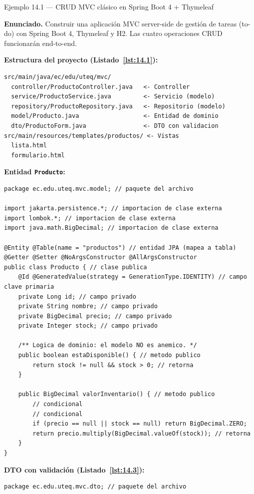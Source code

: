 \begin{cajaejemplo}{Ejemplo 14.1 --- CRUD MVC clásico en Spring Boot 4 + Thymeleaf}


\textbf{Enunciado.} Construir una aplicación MVC server-side de gestión de tareas (to-do) con Spring Boot 4, Thymeleaf y H2. Las cuatro operaciones CRUD funcionarán end-to-end.

\textbf{Estructura del proyecto (Listado~\ref{lst:14.1}):}
\begin{lstlisting}[style=shell,numbers=none,caption={Ejemplo de Shell},label=lst:14.1]
src/main/java/ec/edu/uteq/mvc/
  controller/ProductoController.java   <- Controller
  service/ProductoService.java         <- Servicio (modelo)
  repository/ProductoRepository.java   <- Repositorio (modelo)
  model/Producto.java                  <- Entidad de dominio
  dto/ProductoForm.java                <- DTO con validacion
src/main/resources/templates/productos/ <- Vistas
  lista.html
  formulario.html
\end{lstlisting}

\textbf{Entidad \texttt{Producto}:}
\begin{lstlisting}[style=java,caption={Producto.java},label=lst:14.2]
package ec.edu.uteq.mvc.model; // paquete del archivo

import jakarta.persistence.*; // importacion de clase externa
import lombok.*; // importacion de clase externa
import java.math.BigDecimal; // importacion de clase externa

@Entity @Table(name = "productos") // entidad JPA (mapea a tabla)
@Getter @Setter @NoArgsConstructor @AllArgsConstructor
public class Producto { // clase publica
    @Id @GeneratedValue(strategy = GenerationType.IDENTITY) // campo clave primaria
    private Long id; // campo privado
    private String nombre; // campo privado
    private BigDecimal precio; // campo privado
    private Integer stock; // campo privado

    /** Logica de dominio: el modelo NO es anemico. */
    public boolean estaDisponible() { // metodo publico
        return stock != null && stock > 0; // retorna
    }

    public BigDecimal valorInventario() { // metodo publico
        // condicional
        // condicional
        if (precio == null || stock == null) return BigDecimal.ZERO;
        return precio.multiply(BigDecimal.valueOf(stock)); // retorna
    }
}
\end{lstlisting}

\textbf{DTO con validación (Listado~\ref{lst:14.3}):}
\begin{lstlisting}[style=java,caption={ProductoForm.java},label=lst:14.3]
package ec.edu.uteq.mvc.dto; // paquete del archivo


\end{lstlisting}
\end{cajaejemplo}

